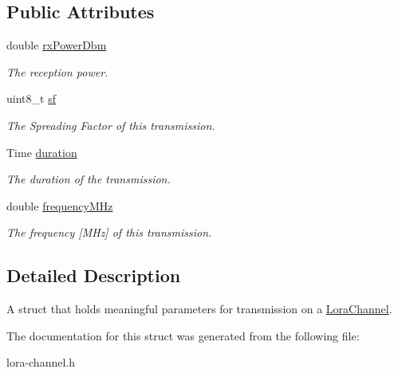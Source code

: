 \subsection*{Public Attributes}
\begin{DoxyCompactItemize}
\item 
\mbox{\label{structns3_1_1lorawan_1_1LoraChannelParameters_a3407e61d9e37d95f1a48dfac0e149322}} 
double \hyperlink{structns3_1_1lorawan_1_1LoraChannelParameters_a3407e61d9e37d95f1a48dfac0e149322}{rx\+Power\+Dbm}
\begin{DoxyCompactList}\small\item\em The reception power. \end{DoxyCompactList}\item 
\mbox{\label{structns3_1_1lorawan_1_1LoraChannelParameters_a29cf034507b8d3699f15f9378854fa9f}} 
uint8\+\_\+t \hyperlink{structns3_1_1lorawan_1_1LoraChannelParameters_a29cf034507b8d3699f15f9378854fa9f}{sf}
\begin{DoxyCompactList}\small\item\em The Spreading Factor of this transmission. \end{DoxyCompactList}\item 
\mbox{\label{structns3_1_1lorawan_1_1LoraChannelParameters_a9c9607a4a3266ad3226cf5371958a5d6}} 
Time \hyperlink{structns3_1_1lorawan_1_1LoraChannelParameters_a9c9607a4a3266ad3226cf5371958a5d6}{duration}
\begin{DoxyCompactList}\small\item\em The duration of the transmission. \end{DoxyCompactList}\item 
\mbox{\label{structns3_1_1lorawan_1_1LoraChannelParameters_a4dca282e8a145b9b67f123f6228d7374}} 
double \hyperlink{structns3_1_1lorawan_1_1LoraChannelParameters_a4dca282e8a145b9b67f123f6228d7374}{frequency\+M\+Hz}
\begin{DoxyCompactList}\small\item\em The frequency \mbox{[}M\+Hz\mbox{]} of this transmission. \end{DoxyCompactList}\end{DoxyCompactItemize}


\subsection{Detailed Description}
A struct that holds meaningful parameters for transmission on a \hyperlink{classns3_1_1lorawan_1_1LoraChannel}{Lora\+Channel}. 

The documentation for this struct was generated from the following file\+:\begin{DoxyCompactItemize}
\item 
lora-\/channel.\+h\end{DoxyCompactItemize}
